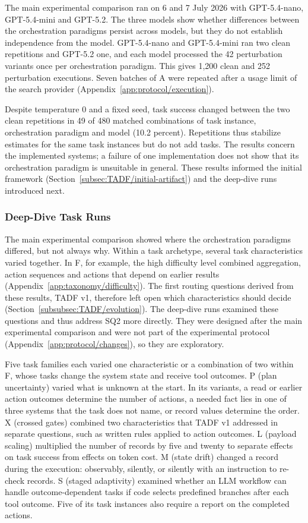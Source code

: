 The main experimental comparison ran on 6 and 7 July 2026 with GPT-5.4-nano, GPT-5.4-mini and GPT-5.2. The three models show whether differences between the orchestration paradigms persist across models, but they do not establish independence from the model. GPT-5.4-nano and GPT-5.4-mini ran two clean repetitions and GPT-5.2 one, and each model processed the 42 perturbation variants once per orchestration paradigm. This gives 1,200 clean and 252 perturbation executions. Seven batches of A were repeated after a usage limit of the search provider (Appendix~\ref{app:protocol/execution}).

Despite temperature 0 and a fixed seed, task success changed between the two clean repetitions in 49 of 480 matched combinations of task instance, orchestration paradigm and model (10.2 percent). Repetitions thus stabilize estimates for the same task instances but do not add tasks. The results concern the implemented systems; a failure of one implementation does not show that its orchestration paradigm is unsuitable in general. These results informed the initial framework (Section~\ref{subsec:TADF/initial-artifact}) and the deep-dive runs introduced next.

\subsubsection{Deep-Dive Task Runs}
\label{subsubsec:TADF/deepdive}
The main experimental comparison showed where the orchestration paradigms differed, but not always why. Within a task archetype, several task characteristics varied together. In F, for example, the high difficulty level combined aggregation, action sequences and actions that depend on earlier results (Appendix~\ref{app:taxonomy/difficulty}). The first routing questions derived from these results, TADF v1, therefore left open which characteristics should decide (Section~\ref{subsubsec:TADF/evolution}). The deep-dive runs examined these questions and thus address SQ2 more directly. They were designed after the main experimental comparison and were not part of the experimental protocol (Appendix~\ref{app:protocol/changes}), so they are exploratory.

Five task families each varied one characteristic or a combination of two within F, whose tasks change the system state and receive tool outcomes. P (plan uncertainty) varied what is unknown at the start. In its variants, a read or earlier action outcomes determine the number of actions, a needed fact lies in one of three systems that the task does not name, or record values determine the order. X (crossed gates) combined two characteristics that TADF v1 addressed in separate questions, such as written rules applied to action outcomes. L (payload scaling) multiplied the number of records by five and twenty to separate effects on task success from effects on token cost. M (state drift) changed a record during the execution: observably, silently, or silently with an instruction to re-check records. S (staged adaptivity) examined whether an LLM workflow can handle outcome-dependent tasks if code selects predefined branches after each tool outcome. Five of its task instances also require a report on the completed actions.


